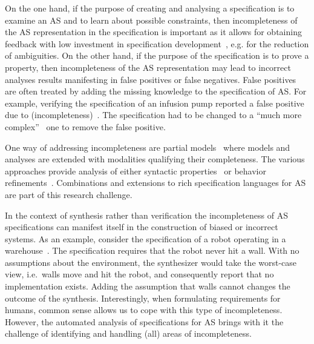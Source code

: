 \documentclass[sigconf,nonacm]{acmart}%
\begin{document}
	On the one hand, if the purpose of creating and analysing a specification is to examine an AS and to learn about possible constraints, then incompleteness of the AS representation in the specification is important as it allows for obtaining feedback with low investment in specification development~\cite{Jackson19}, e.g. for the reduction of ambiguities. 
	On the other hand, if the purpose of the specification is to prove a property, then incompleteness of the AS representation may lead to incorrect analyses results manifesting in false positives or false negatives. False positives are often treated by adding the missing knowledge to the specification of AS. For example, verifying the specification of an infusion pump reported a false positive due to (incompleteness)~\cite{HarrisonMCC17}. The specification had to be changed to a ``much more complex''~\cite{HarrisonMCC17} one to remove the false positive.

    One way of addressing incompleteness are partial models~\cite{WeiGC11,FamelisSC12} where models and analyses are extended with modalities qualifying their completeness. The various approaches provide analysis of either syntactic properties~\cite{FamelisSC12} or behavior refinements~\cite{WeiGC11}. Combinations and extensions to rich specification languages for AS are part of this research challenge.
	
	In the context of synthesis rather than verification the incompleteness of AS specifications can manifest itself in the construction of biased or incorrect systems. 
	As an example, consider the specification of a robot operating in a warehouse~\cite{MaozR18robot}. The specification requires that the robot never hit a wall. With no assumptions about the environment, the synthesizer would take the worst-case view, i.e.\ walls move and hit the robot, and consequently report that no implementation exists. Adding the assumption that walls cannot changes the outcome of the synthesis. 
	Interestingly, when formulating requirements for humans, common sense allows us to cope with this type of incompleteness. 
	However, the automated analysis of specifications for AS brings with it the challenge of identifying and handling (all) areas of incompleteness.
	
\end{document}
